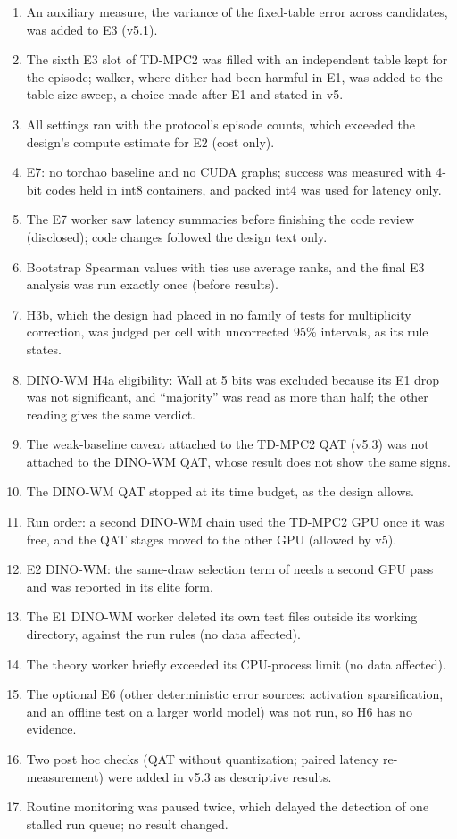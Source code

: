 \begin{enumerate}
\item An auxiliary measure, the variance of the fixed-table error across candidates, was added to E3 (v5.1).
\item The sixth E3 slot of TD-MPC2 was filled with an independent table kept for the episode; walker, where dither had been harmful in E1, was added to the table-size sweep, a choice made after E1 and stated in v5.
\item All settings ran with the protocol's episode counts, which exceeded the design's compute estimate for E2 (cost only).
\item E7: no torchao baseline and no CUDA graphs; success was measured with 4-bit codes held in int8 containers, and packed int4 was used for latency only.
\item The E7 worker saw latency summaries before finishing the code review (disclosed); code changes followed the design text only.
\item Bootstrap Spearman values with ties use average ranks, and the final E3 analysis was run exactly once (before results).
\item H3b, which the design had placed in no family of tests for multiplicity correction, was judged per cell with uncorrected 95\% intervals, as its rule states.
\item DINO-WM H4a eligibility: Wall at 5 bits was excluded because its E1 drop was not significant, and ``majority'' was read as more than half; the other reading gives the same verdict.
\item The weak-baseline caveat attached to the TD-MPC2 QAT (v5.3) was not attached to the DINO-WM QAT, whose result does not show the same signs.
\item The DINO-WM QAT stopped at its time budget, as the design allows.
\item Run order: a second DINO-WM chain used the TD-MPC2 GPU once it was free, and the QAT stages moved to the other GPU (allowed by v5).
\item E2 DINO-WM: the same-draw selection term of \shiter needs a second GPU pass and was reported in its elite form.
\item The E1 DINO-WM worker deleted its own test files outside its working directory, against the run rules (no data affected).
\item The theory worker briefly exceeded its CPU-process limit (no data affected).
\item The optional E6 (other deterministic error sources: activation sparsification, and an offline test on a larger world model) was not run, so H6 has no evidence.
\item Two post hoc checks (QAT without quantization; paired latency re-measurement) were added in v5.3 as descriptive results.
\item Routine monitoring was paused twice, which delayed the detection of one stalled run queue; no result changed.
\end{enumerate}

